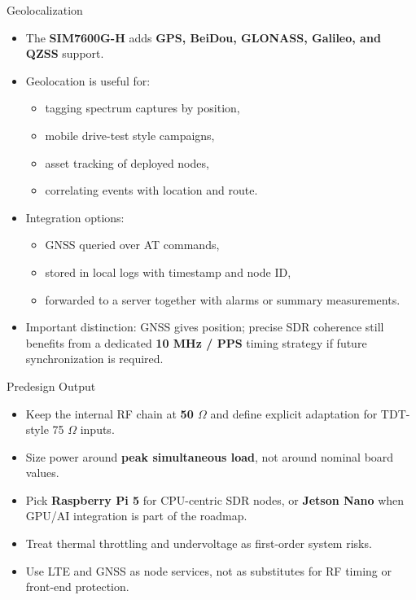 \documentclass{beamer}
\begin{document}
\begin{frame}{Geolocalization}
    \small
    \begin{itemize}
        \item The \textbf{SIM7600G-H} adds \textbf{GPS, BeiDou, GLONASS, Galileo, and QZSS} support.
        \item Geolocation is useful for:
        \begin{itemize}
            \item tagging spectrum captures by position,
            \item mobile drive-test style campaigns,
            \item asset tracking of deployed nodes,
            \item correlating events with location and route.
        \end{itemize}
        \item Integration options:
        \begin{itemize}
            \item GNSS queried over AT commands,
            \item stored in local logs with timestamp and node ID,
            \item forwarded to a server together with alarms or summary measurements.
        \end{itemize}
        \item Important distinction: GNSS gives position; precise SDR coherence still benefits from a dedicated \textbf{10 MHz / PPS} timing strategy if future synchronization is required.
    \end{itemize}
\end{frame}

\begin{frame}{Predesign Output}
    \begin{itemize}
        \item Keep the internal RF chain at \textbf{50 $\Omega$} and define explicit adaptation for TDT-style 75 $\Omega$ inputs.
        \item Size power around \textbf{peak simultaneous load}, not around nominal board values.
        \item Pick \textbf{Raspberry Pi 5} for CPU-centric SDR nodes, or \textbf{Jetson Nano} when GPU/AI integration is part of the roadmap.
        \item Treat thermal throttling and undervoltage as first-order system risks.
        \item Use LTE and GNSS as node services, not as substitutes for RF timing or front-end protection.
    \end{itemize}
\end{frame}
\end{document}
